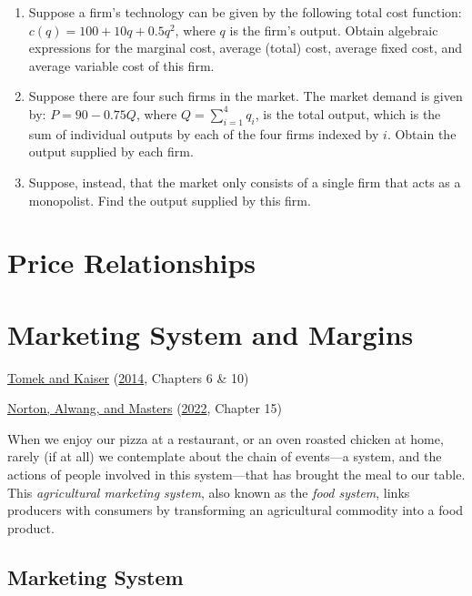 \documentclass[
  oneside]{book}
\providecommand{\tightlist}{%
  \setlength{\itemsep}{0pt}\setlength{\parskip}{0pt}}
\begin{document}
\begin{enumerate}
\def\labelenumi{\arabic{enumi}.}
\tightlist
\item
  Suppose a firm's technology can be given by the following total cost function: \(c(q) = 100 + 10q +0.5q^2\), where \(q\) is the firm's output. Obtain algebraic expressions for the marginal cost, average (total) cost, average fixed cost, and average variable cost of this firm.
\item
  Suppose there are four such firms in the market. The market demand is given by: \(P = 90 - 0.75Q\), where \(Q = \sum_{i=1}^4 q_i\), is the total output, which is the sum of individual outputs by each of the four firms indexed by \(i\). Obtain the output supplied by each firm.
\item
  Suppose, instead, that the market only consists of a single firm that acts as a monopolist. Find the output supplied by this firm.
\end{enumerate}

\hypertarget{price-relationships}{%
\chapter*{Price Relationships}\label{price-relationships}}

\hypertarget{marketing-system-and-margins}{%
\chapter{Marketing System and Margins}\label{marketing-system-and-margins}}

\protect\hyperlink{ref-tomek2014}{Tomek and Kaiser} (\protect\hyperlink{ref-tomek2014}{2014}, Chapters 6 \& 10)

\protect\hyperlink{ref-norton2022}{Norton, Alwang, and Masters} (\protect\hyperlink{ref-norton2022}{2022}, Chapter 15)

When we enjoy our pizza at a restaurant, or an oven roasted chicken at home, rarely (if at all) we contemplate about the chain of events---a system, and the actions of people involved in this system---that has brought the meal to our table. This \emph{agricultural marketing system}, also known as the \emph{food system}, links producers with consumers by transforming an agricultural commodity into a food product.

\hypertarget{marketing-system}{%
\section{Marketing System}\label{marketing-system}}
\end{document}
